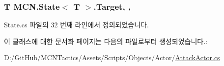 \subsubsection[{\texorpdfstring{Target}{Target}}]{\setlength{\rightskip}{0pt plus 5cm}T {\bf M\+C\+N.\+State}$<$ T $>$.Target\hspace{0.3cm}{\ttfamily [get]}, {\ttfamily [protected]}, {\ttfamily [inherited]}}\hypertarget{class_m_c_n_1_1_state_a93ba2fd920292031bd6e65b1dc505cb3}{}\label{class_m_c_n_1_1_state_a93ba2fd920292031bd6e65b1dc505cb3}


State.\+cs 파일의 32 번째 라인에서 정의되었습니다.



이 클래스에 대한 문서화 페이지는 다음의 파일로부터 생성되었습니다.\+:\begin{DoxyCompactItemize}
\item 
D\+:/\+Git\+Hub/\+M\+C\+N\+Tactics/\+Assets/\+Scripts/\+Objects/\+Actor/\hyperlink{_attack_actor_8cs}{Attack\+Actor.\+cs}\end{DoxyCompactItemize}
